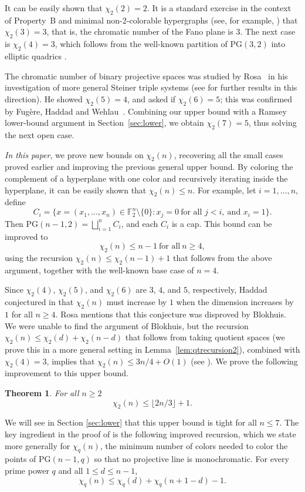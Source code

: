 \documentclass[11pt]{article}
\theoremstyle{plain}
\newtheorem{theorem}{Theorem}
\newcommand{\F}{\mathbb{F}}
\newcommand{\PG}{\mathrm{PG}}
\begin{document}
It can be easily shown that $\chi_2(2) = 2$. 
It is a standard exercise in the context of Property~B and minimal non-2-colorable hypergraphs (see, for example, \cite[Section 1.3]{ZhaoPM}) that $\chi_2(3) = 3$, that is, the chromatic number of the Fano plane is $3$. 
The next case is $\chi_2(4) = 3$, which follows from the well-known partition of $\mathrm{PG}(3,2)$ into elliptic quadrics \cite{Ebert1985}.

The chromatic number of binary projective spaces was studied by Rosa~\cite{Rosa1970-1, Rosa1970-2} in his investigation of more general Steiner triple systems (see \cite{BrandesPhelpsRodl1982, BruenHaddadWehlau1998} for further results in this direction).
He showed $\chi_2(5)=4$, and asked if $\chi_2(6)=5$; this was confirmed by Fug\`ere, Haddad and Wehlau~\cite{Fugere1994}.
Combining our upper bound with a Ramsey lower-bound argument in Section~\ref{sec:lower}, we obtain $\chi_2(7)=5$, thus solving the next open case.

\textit{In this paper}, we prove new bounds on $\chi_2(n)$, recovering all the small cases proved earlier and improving the previous general upper bound. 
By coloring the complement of a hyperplane with one color and recursively iterating inside the hyperplane, it can be easily shown that $\chi_2(n) \leq n$. For example, let $i=1,\dots,n$, define 
\[
C_i=\{x=(x_1,\dots,x_n)\in \F_2^n\setminus\{0\} : x_j=0\ \text{for all } j<i,\ \text{and } x_i=1\}.
\]
Then $\PG(n - 1, 2) = \bigsqcup_{i=1}^n C_i$, and each $C_i$ is a cap. 
This bound can be improved to \[\chi_2(n) \le n-1\ \text{for all}\ n\ge 4,\] using the recursion $\chi_2(n)\leq \chi_2(n - 1) + 1$ that follows from the above argument, together with the well-known base case of $n = 4$. 

Since $\chi_2(4)$, $\chi_2(5)$, and $\chi_2(6)$ are $3$, $4$, and $5$, respectively, Haddad conjectured in \cite{Haddad1999} that $\chi_2(n)$ must increase by $1$ when the dimension increases by $1$ for all $n \geq 4$. 
Rosa \cite{Rosa2019} mentions that this conjecture was disproved by Blokhuis.
We were unable to find the argument of Blokhuis, but the recursion $\chi_2(n) \leq \chi_2(d) + \chi_2(n - d)$ that follows from taking quotient spaces (we prove this in a more general setting in Lemma~\ref{lem:qtrecursion2}), combined with $\chi_2(4) = 3$, implies that 
$\chi_2(n) \le 3n/4 + O(1)$ (see ). 
We prove the following improvement to this upper bound. 
\begin{theorem}\label{thm:main}
For all $n \geq 2$
\[\chi_2(n)\le \lfloor 2n/3 \rfloor + 1 .\]
\end{theorem}
We will see in Section \ref{sec:lower} that this upper bound is tight for all $n \leq 7$. 
The key ingredient in the proof of  is the following improved recursion, which we state more generally for $\chi_q(n)$, the minimum number of colors needed to color the points of \(\mathrm{PG}(n-1,q)\) so that no projective line is monochromatic. 
For every prime power $q$ and all $1\le d\le n-1$,
\begin{equation}\label{eq:recursion}
\chi_q(n)\le \chi_q(d) + \chi_q(n+1-d)-1.
\end{equation}
\end{document}
